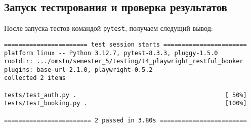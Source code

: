 \documentclass[a4paper]{article}
\begin{document}
    \subsection{Запуск тестирования и проверка результатов}

    После запуска тестов командой \texttt{pytest}, получаем следущий вывод:

    \begin{verbatim}
======================= test session starts =======================
platform linux -- Python 3.12.7, pytest-8.3.3, pluggy-1.5.0
rootdir: .../omstu/semester_5/testing/t4_playwright_restful_booker
plugins: base-url-2.1.0, playwright-0.5.2
collected 2 items                                        

tests/test_auth.py .                                         [ 50%]
tests/test_booking.py .                                      [100%]

======================== 2 passed in 3.80s ========================
    \end{verbatim}
\end{document}
